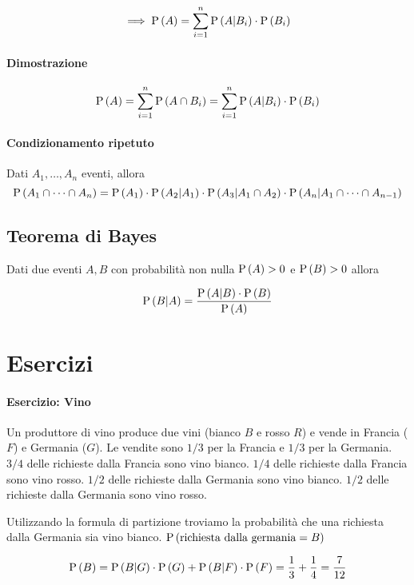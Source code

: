 \[ \implies  \text{P}\left(A\right) = \sum_{i=1}^{n} \text{P}\left(A|B_i\right) \cdot \text{P}\left(B_i\right) \]

\paragraph{Dimostrazione} 

\[ \text{P}\left(A\right) =  \sum_{i=1}^{n} \text{P}\left(A \cap B_i\right) = \sum_{i=1}^{n} \text{P}\left(A|B_i\right) \cdot \text{P}\left(B_i\right) \]

\paragraph{Condizionamento ripetuto}
Dati $ A_1, \dots, A_n $ eventi, allora 
\[ \text{P}\left(A_1 \cap \dots \cap A_n\right) = \text{P}\left(A_1\right) \cdot \text{P}\left(A_2|A_1\right) \cdot \text{P}\left(A_3| A_1 \cap A_2\right) \cdot \text{P}\left(A_n | A_1 \cap \dots \cap A_{n-1}\right)\]

\subsection{Teorema di Bayes}


Dati due eventi $ A,B $ con probabilità non nulla $ \text{P}\left(A\right) > 0 $ e $ \text{P}\left(B\right) > 0 $ allora 

\[ \text{P}\left(B|A\right) = \dfrac{\text{P}\left(A|B\right) \cdot \text{P}\left(B\right) }{\text{P}\left(A\right)}\]


\section{Esercizi}

\paragraph{Esercizio: Vino}

Un produttore di vino produce due vini (bianco $ B $ e rosso $ R $) e vende in Francia ($ F $) e Germania ($ G $). 
Le vendite sono $ 1/3 $ per la Francia e $ 1/3 $ per la Germania. $ 3/4 $ delle richieste dalla Francia sono vino bianco. $ 1/4 $ delle richieste dalla Francia sono vino rosso. $ 1/2 $ delle richieste dalla Germania sono vino bianco. $ 1/2 $ delle richieste dalla Germania sono vino rosso.

Utilizzando la formula di partizione troviamo la probabilità che una richiesta dalla Germania sia vino bianco. $ \text{P}\left(\text{richiesta dalla germania} = B\right) $

\[ \text{P}\left(B\right) = \text{P}\left(B|G\right) \cdot \text{P}\left(G\right) + \text{P}\left(B|F\right) \cdot \text{P}\left(F\right) = \dfrac{1}{3} + \dfrac{1}{4} = \dfrac{7}{12} \]

